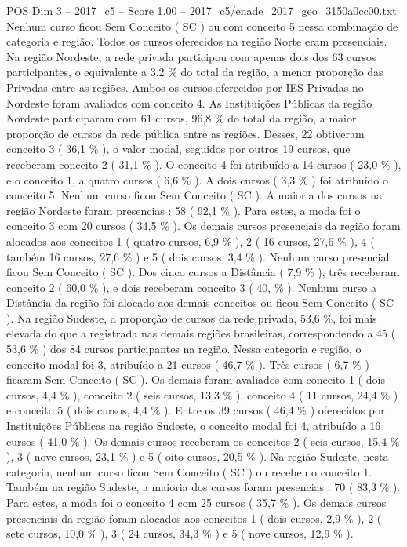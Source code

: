 \begin{textsample}{POS Dim 3 – 2017\_c5 – Score 1.00 – 2017\_c5/enade\_2017\_geo\_3150a0cc00.txt}
Nenhum curso ficou Sem Conceito ( SC ) ou com conceito 5 nessa combinação de categoria e região.
Todos os cursos oferecidos na região Norte eram presenciais.
Na região Nordeste, a rede privada participou com apenas dois dos 63 cursos participantes, o equivalente a 3,2 \% do total da região, a menor proporção das Privadas entre as regiões.
Ambos os cursos oferecidos por IES Privadas no Nordeste foram avaliados com conceito 4.
As Instituições Públicas da região Nordeste participaram com 61 cursos, 96,8 \% do total da região, a maior proporção de cursos da rede pública entre as regiões.
Desses, 22 obtiveram conceito 3 ( 36,1 \% ), o valor modal, seguidos por outros 19 cursos, que receberam conceito 2 ( 31,1 \% ).
O conceito 4 foi atribuído a 14 cursos ( 23,0 \% ), e o conceito 1, a quatro cursos ( 6,6 \% ).
A dois cursos ( 3,3 \% ) foi atribuído o conceito 5.
Nenhum curso ficou Sem Conceito ( SC ).
A maioria dos cursos na região Nordeste foram presencias : 58 ( 92,1 \% ).
Para estes, a moda foi o conceito 3 com 20 cursos ( 34,5 \% ).
Os demais cursos presenciais da região foram alocados aos conceitos 1 ( quatro cursos, 6,9 \% ), 2 ( 16 cursos, 27,6 \% ), 4 ( também 16 cursos, 27,6 \% ) e 5 ( dois cursos, 3,4 \% ).
Nenhum curso presencial ficou Sem Conceito ( SC ).
Dos cinco cursos a Distância ( 7,9 \% ), três receberam conceito 2 ( 60,0 \% ), e dois receberam conceito 3 ( 40, \% ).
Nenhum curso a Distância da região foi alocado aos demais conceitos ou ficou Sem Conceito ( SC ).
Na região Sudeste, a proporção de cursos da rede privada, 53,6 \%, foi mais elevada do que a registrada nas demais regiões brasileiras, correspondendo a 45 ( 53,6 \% ) dos 84 cursos participantes na região.
Nessa categoria e região, o conceito modal foi 3, atribuído a 21 cursos ( 46,7 \% ).
Três cursos ( 6,7 \% ) ficaram Sem Conceito ( SC ).
Os demais foram avaliados com conceito 1 ( dois cursos, 4,4 \% ), conceito 2 ( seis cursos, 13,3 \% ), conceito 4 ( 11 cursos, 24,4 \% ) e conceito 5 ( dois cursos, 4,4 \% ).
Entre os 39 cursos ( 46,4 \% ) oferecidos por Instituições Públicas na região Sudeste, o conceito modal foi 4, atribuído a 16 cursos ( 41,0 \% ).
Os demais cursos receberam os conceitos 2 ( seis cursos, 15,4 \% ), 3 ( nove cursos, 23,1 \% ) e 5 ( oito cursos, 20,5 \% ).
Na região Sudeste, nesta categoria, nenhum curso ficou Sem Conceito ( SC ) ou recebeu o conceito 1.
Também na região Sudeste, a maioria dos cursos foram presencias : 70 ( 83,3 \% ).
Para estes, a moda foi o conceito 4 com 25 cursos ( 35,7 \% ).
Os demais cursos presenciais da região foram alocados aos conceitos 1 ( dois cursos, 2,9 \% ), 2 ( sete cursos, 10,0 \% ), 3 ( 24 cursos, 34,3 \% ) e 5 ( nove cursos, 12,9 \% ).

\end{textsample}

